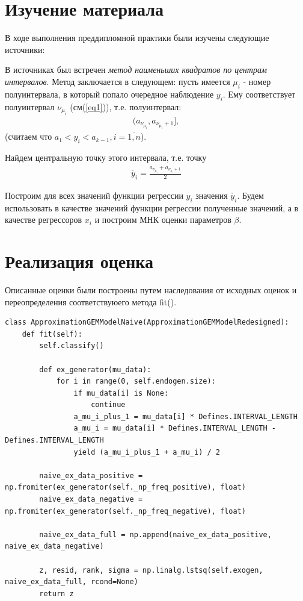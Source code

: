 

\section{Изучение материала}
В ходе выполнения преддипломной практики были изучены следующие источники:


В источниках был встречен \textit{метод наименьших квадратов по центрам интервалов}.
Метод заключается в следующем:
пусть имеется $\mu_i$ - номер полуинтервала, в который попало очередное наблюдение $y_i$. Ему соответствует полуинтервал $\nu_{\mu_i}$ (см(\ref{eq1})), т.е. полуинтервал:
\begin{eqnarray}
    (a_{\nu_{\mu_i}},a_{\nu_{\mu_i}+1}],
\end{eqnarray}
(считаем что $a_1<y_i<a_{k-1}, i=\overline{1,n}$).

Найдем центральную точку этого интервала, т.е. точку
\begin{eqnarray}
    \check{y_i} = \frac{a_{\nu_{\mu_i}} + a_{\nu_{\mu_i}+1}}{2}
\end{eqnarray}

Построим для всех значений функции регрессии $y_i$ значения $\check{y_i}$.
Будем использовать в качестве значений функции регрессии полученные значений, а в качестве регрессоров $x_i$ и построим МНК оценки параметров $\beta$.

\newpage
\section{Реализация оценка}
Описанные оценки были построены путем наследования от исходных оценок и переопределения соответствуюего метода fit(). 
\begin{Verbatim}[fontsize=\scriptsize]
class ApproximationGEMModelNaive(ApproximationGEMModelRedesigned):
    def fit(self):
        self.classify()

        def ex_generator(mu_data):
            for i in range(0, self.endogen.size):
                if mu_data[i] is None:
                    continue
                a_mu_i_plus_1 = mu_data[i] * Defines.INTERVAL_LENGTH
                a_mu_i = mu_data[i] * Defines.INTERVAL_LENGTH - Defines.INTERVAL_LENGTH
                yield (a_mu_i_plus_1 + a_mu_i) / 2

        naive_ex_data_positive = np.fromiter(ex_generator(self._np_freq_positive), float)
        naive_ex_data_negative = np.fromiter(ex_generator(self._np_freq_negative), float)

        naive_ex_data_full = np.append(naive_ex_data_positive, naive_ex_data_negative)

        z, resid, rank, sigma = np.linalg.lstsq(self.exogen, naive_ex_data_full, rcond=None)
        return z
\end{Verbatim}

